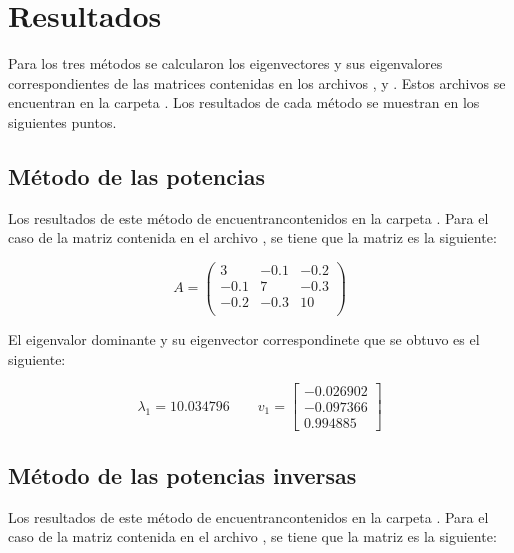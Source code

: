 \section{Resultados}

Para los tres métodos se calcularon los eigenvectores y sus eigenvalores correspondientes de las matrices contenidas en los archivos ,  y . Estos archivos se encuentran en la carpeta . Los resultados de cada método se muestran en los siguientes puntos.

\subsection{Método de las potencias \label{sec:power_results}}

Los resultados de este método de encuentrancontenidos en la carpeta . Para el caso de la matriz contenida en el archivo , se tiene que la matriz es la siguiente:

\begin{equation*}
    A= \begin{pmatrix}
        3    & -0.1 & -0.2 \\
        -0.1 & 7    & -0.3 \\
        -0.2 & -0.3 & 10   \\
    \end{pmatrix}
\end{equation*}

El eigenvalor dominante y su eigenvector correspondinete que se obtuvo es el siguiente:

\begin{equation*}
    \lambda_1 = 10.034796 \qquad v_1 =
    \begin{bmatrix}
        -0.026902 \\	-0.097366\\	0.994885
    \end{bmatrix}
\end{equation*}

\subsection{Método de las potencias inversas}

Los resultados de este método de encuentrancontenidos en la carpeta . Para el caso de la matriz contenida en el archivo , se tiene que la matriz es la siguiente:

